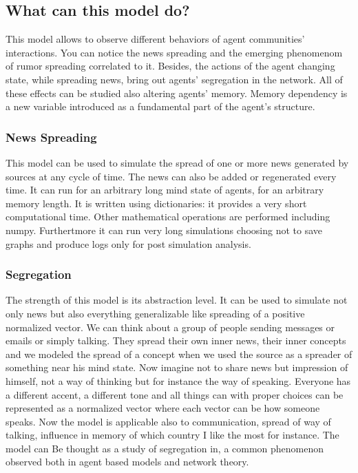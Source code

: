 \subsection{What can this model do?}
This model allows to observe different behaviors of agent communities'
interactions.
You can notice the news spreading and the emerging phenomenom of rumor
spreading correlated to it.
Besides, the actions of the agent changing state, while spreading news, bring
out agents' segregation in the network.
All of these effects can be studied also altering agents' memory.
Memory dependency is a new variable introduced as a fundamental
part of the agent's structure.

\subsubsection{News Spreading}
This model can be used to simulate the spread of one or more news generated
by sources at any cycle of time. The news can also be added or regenerated
every time. It can run for an arbitrary long mind state of agents,
for an arbitrary memory length.
It is written using dictionaries: it provides a very short computational time.
Other mathematical operations are performed including numpy.
Furthertmore it can run very long simulations choosing not to save graphs
and produce logs only for post simulation analysis.

\subsubsection{Segregation}
The strength of this model is its abstraction level.
It can be used to simulate not only news but also everything
generalizable like spreading of a positive normalized vector.
We can think about a group of people sending messages or emails or simply
talking. They spread their own inner news, their inner concepts and we modeled
the spread of a concept when we used the source as a spreader of something near
his mind state.
Now imagine not to share news but impression of himself, not a way of thinking
but for instance the way of speaking. Everyone has a different accent, a
different tone and all things can with proper choices can be represented
as a normalized vector where each vector can be how someone speaks.
Now the model is applicable also to communication, spread of way of talking,
influence in memory of which country I like the most for instance.
The model can Be thought as a study of segregation in, a common phenomenon
observed both in agent based models and network theory.
